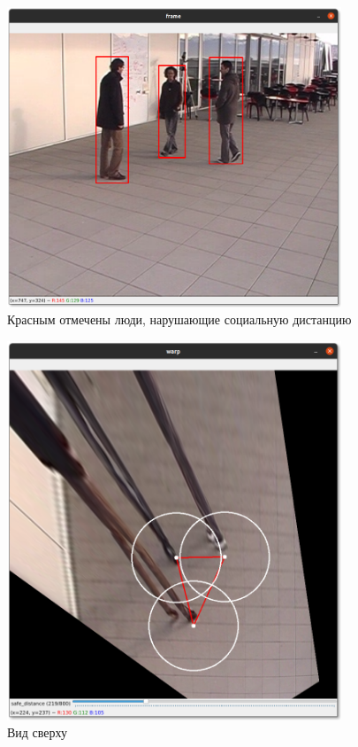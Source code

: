 \begin{figure}[H]
    \centering
    \includegraphics[width=10cm]{images/danger1.png}
    \caption{Красным отмечены люди, нарушающие социальную дистанцию}
    \label{<label>}
\end{figure}

\begin{figure}[H]
    \centering
    \includegraphics[width=10cm]{images/danger2.png}
    \caption{Вид сверху}
    \label{<label>}
\end{figure}

